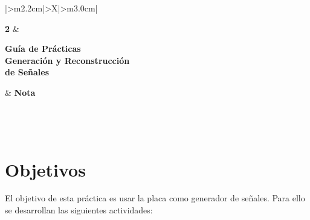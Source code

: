 \documentclass[11pt,a4paper]{article}
\begin{document}
\begingroup
\renewcommand{\tabularxcolumn}[1]{m{#1}}
\renewcommand{\arraystretch}{2.0}
\setlength{\tabcolsep}{12pt}
\noindent
\begin{tabularx}{\textwidth}{|>{\centering\arraybackslash}m{2.2cm}|>{\centering\arraybackslash}X|>{\centering\arraybackslash}m{3.0cm}|}
\hline
\rule{0pt}{2.1cm}{\fontsize{58}{58}\selectfont\bfseries 2}
    & \begin{minipage}[c]{\linewidth}\centering
          {\large\bfseries Guía de Prácticas}\\[7pt]
          {\Large\bfseries Generación y Reconstrucción\\ de Señales}
      \end{minipage}
    & {\Large\bfseries Nota}\\
\hline
{}\\
\hline
{}\\
\\
\hline
\end{tabularx}
\endgroup

\vspace{0.8cm}

\section{Objetivos}
El objetivo de esta práctica es usar la placa como generador de señales. Para ello
se desarrollan las siguientes actividades:
\end{document}
